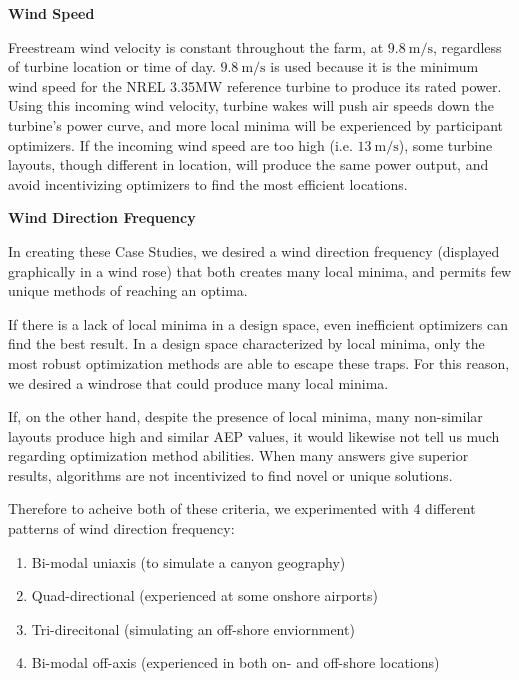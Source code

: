 \vspace{3mm}
\noindent\textbf{Wind Speed}

	\noindent Freestream wind velocity is constant throughout the farm, at $9.8\ \textrm{m/s}$, regardless of turbine location or time of day.
	$9.8\ \textrm{m/s}$ is used because it is the minimum wind speed for the NREL 3.35MW reference turbine to produce its rated power.
	Using this incoming wind velocity, turbine wakes will push air speeds down the turbine's power curve, and more local minima will be experienced by participant optimizers.
	If the incoming wind speed are too high (i.e. $13\ \textrm{m/s}$), some turbine layouts, though different in location, will produce the same power output, and avoid incentivizing optimizers to find the most efficient locations.

\vspace{3mm}
\noindent\textbf{Wind Direction Frequency}

	\noindent In creating these Case Studies, we desired a wind direction frequency (displayed graphically in a wind rose) that both creates many local minima, and permits few unique methods of reaching an optima.
	
	If there is a lack of local minima in a design space, even inefficient optimizers can find the best result.
	In a design space characterized by local minima, only the most robust optimization methods are able to escape these traps.
	For this reason, we desired a windrose that could produce many local minima.
	
	If, on the other hand, despite the presence of local minima, many non-similar layouts produce high and similar AEP values, it would likewise not tell us much regarding optimization method abilities.
	When many answers give superior results, algorithms are not incentivized to find novel or unique solutions. 
	
	Therefore to acheive both of these criteria, we experimented with 4 different patterns of wind direction frequency:

	\begin{enumerate}
		\item Bi-modal uniaxis (to simulate a canyon geography)
		\item Quad-directional (experienced at some onshore airports)
		\item Tri-direcitonal (simulating an off-shore enviornment)
		\item Bi-modal off-axis (experienced in both on- and off-shore locations)
	\end{enumerate}

